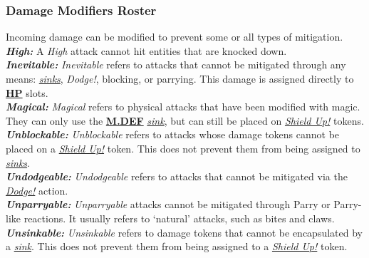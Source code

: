 \documentclass[12pt]{article}
\newcommand{\refto}[1]{\hyperlink{#1}{\textbf{#1}}}
\newcommand{\reftoit}[1]{\hyperlink{#1}{\emph{#1}}}
\newcommand{\makerefit}[1]{\hypertarget{#1}{\emph{#1}}}
\begin{document}
\begin{multicols*}{2}
\subsubsection{Damage Modifiers Roster}
Incoming damage can be modified to prevent some or all types of mitigation.\\

\textbf{\emph{High:}} A \makerefit{High} attack cannot hit entities that are knocked down.\\

\textbf{\emph{Inevitable:}} \makerefit{Inevitable} refers to attacks that cannot be mitigated through any means: \reftoit{sinks}, \emph{Dodge!}, blocking, or parrying. This damage is assigned directly to \refto{HP} slots.\\

\textbf{\emph{Magical:}} \makerefit{Magical} refers to physical attacks that have been modified with magic. They can only use the \refto{M.DEF} \reftoit{sink}, but can still be placed on \reftoit{Shield Up!} tokens.\\

\textbf{\emph{Unblockable:}} \makerefit{Unblockable} refers to attacks whose damage tokens cannot be placed on a \reftoit{Shield Up!} token. This does not prevent them from being assigned to \reftoit{sinks}.\\

\textbf{\emph{Undodgeable:}} \makerefit{Undodgeable} refers to attacks that cannot be mitigated via the \reftoit{Dodge!} action.\\

\textbf{\emph{Unparryable:}} \makerefit{Unparryable} attacks cannot be mitigated through Parry or Parry-like reactions. It usually refers to ‘natural’ attacks, such as bites and claws.\\

\textbf{\emph{Unsinkable:}} \makerefit{Unsinkable} refers to damage tokens that cannot be encapsulated by a \reftoit{sink}. This does not prevent them from being assigned to a \reftoit{Shield Up!} token.


\end{multicols*}
\end{document}
